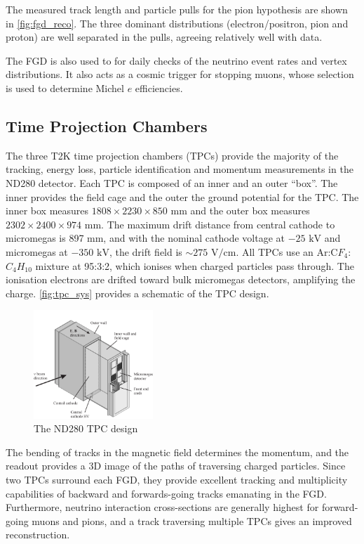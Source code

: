 The measured track length and particle pulls for the pion hypothesis are shown in \autoref{fig:fgd_reco}. The three dominant distributions (electron/positron, pion and proton) are well separated in the pulls, agreeing relatively well with data.

The FGD is also used to for daily checks of the neutrino event rates and vertex distributions. It also acts as a cosmic trigger for stopping muons, whose selection is used to determine Michel $e$ efficiencies.

\subsection{Time Projection Chambers}
The three T2K time projection chambers (TPCs)\cite{t2k_tpc} provide the majority of the tracking, energy loss, particle identification and momentum measurements in the ND280 detector. Each TPC is composed of an inner and an outer ``box''. The inner provides the field cage and the outer the ground potential for the TPC. The inner box measures $1808\times2230\times850\text{ mm}$ and the outer box measures $2302\times2400\times974\text{ mm}$. The maximum drift distance from central cathode to micromegas is 897 mm, and with the nominal cathode voltage at $-25\text{ kV}$ and micromegas at $-350\text{ kV}$, the drift field is $\sim 275\text{ V/cm}$. All TPCs use an Ar:C$F_4$:$C_4H_{10}$ mixture at 95:3:2, which ionises when charged particles pass through. The ionisation electrons are drifted toward bulk micromegas detectors\cite{micromegas1, micromegas2}, amplifying the charge. \autoref{fig:tpc_sys} provides a schematic of the TPC design.
\begin{figure}[h]
	\includegraphics[width=0.4\textwidth, trim={0mm 0mm 0mm 0mm}, clip,page=1]{figures/det_chap/tpc/tpc_1}
	\caption{The ND280 TPC design}
	\label{fig:tpc_sys}
\end{figure}

The bending of tracks in the magnetic field determines the momentum, and the readout provides a 3D image of the paths of traversing charged particles. Since two TPCs surround each FGD, they provide excellent tracking and multiplicity capabilities of backward and forwards-going tracks emanating in the FGD. Furthermore, neutrino interaction cross-sections are generally highest for forward-going muons and pions, and a track traversing multiple TPCs gives an improved reconstruction.

